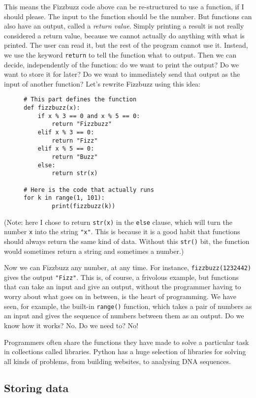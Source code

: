 \documentclass[a4paper]{article}
\begin{document}
This means the Fizzbuzz code above can be re-structured to use a function, if I should please. The input to the function should be the number. But functions can also have an output, called a \emph{return value}. Simply printing a result is not really considered a return value, because we cannot actually do anything with what is printed. The user can read it, but the rest of the program cannot use it. Instead, we use the keyword \verb|return| to tell the function what to output. Then we can decide, independently of the function: do we want to print the output? Do we want to store it for later? Do we want to immediately send that output as the input of another function? Let's rewrite Fizzbuzz using this idea:

\begin{figure}[h]
\begin{lstlisting}
# This part defines the function
def fizzbuzz(x):
    if x % 3 == 0 and x % 5 == 0:
        return "Fizzbuzz"
    elif x % 3 == 0:
        return "Fizz"
    elif x % 5 == 0:
        return "Buzz"
    else:
        return str(x)

# Here is the code that actually runs
for k in range(1, 101):
	    print(fizzbuzz(k))
\end{lstlisting}
\end{figure}
(Note: here I chose to return \verb|str(x)| in the \verb|else| clause, which will turn the number \verb|x| into the string \verb|"x"|. This is because it is a good habit that functions should always return the same kind of data. Without this \verb|str()| bit, the function would sometimes return a string and sometimes a number.)

Now we can Fizzbuzz any number, at any time. For instance, \verb|fizzbuzz(1232442)| gives the output \verb|"Fizz"|. This is, of course, a frivolous example, but functions that can take an input and give an output, without the programmer having to worry about what goes on in between, is the heart of programming. We have seen, for example, the built-in \verb|range()| function, which takes a pair of numbers as an input and gives the sequence of numbers between them as an output. Do we know how it works? No. Do we need to? No!

Programmers often share the functions they have made to solve a particular task in collections called libraries. Python has a huge selection of libraries for solving all kinds of problems, from building websites, to analysing DNA sequences.

\subsection{Storing data}
\end{document}
